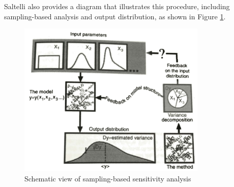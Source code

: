 \documentclass[10pt]{article}
\begin{document}


Saltelli \cite{Saltelli2009-tz} also provides a diagram that illustrates this procedure, including sampling-based analysis and output distribution, as shown in Figure \ref{flowchart}.

            \begin{figure}[h]
            \centering
            \includegraphics[width=9cm]{extras26/flowchart}
            \caption{Schematic view of sampling-based sensitivity analysis \cite{Saltelli2009-tz}}
            \label{flowchart}
            \end{figure}
\end{document}
